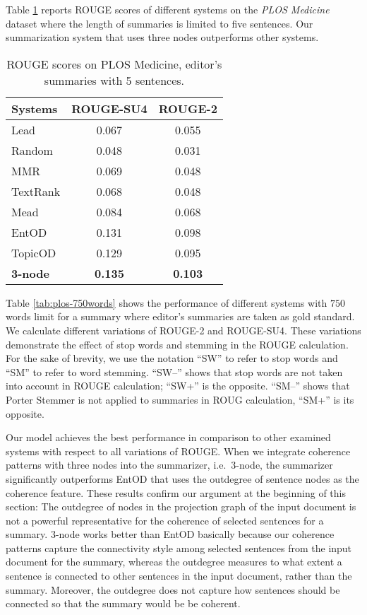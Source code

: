 Table \ref{table:plos_5len_editor} reports ROUGE scores of different systems on the \emph{PLOS Medicine} dataset where the length of summaries is limited to five sentences. 
Our summarization system that uses three nodes outperforms other systems.  


\begin{table}[!ht]
	\begin{center}
		\begin{tabular}{lcc}
		\toprule
		\textbf{Systems} 			& \textbf{ROUGE-SU4} &\textbf{ROUGE-2}\\
		\midrule
		Lead 				& 0.067 	& 0.055  \\
		Random 				& 0.048  	& 0.031  \\
		MMR 				& 0.069 	& 0.048  \\
		TextRank 			& 0.068  	& 0.048  \\
		Mead 				& 0.084 	& 0.068  \\
		EntOD 				& 0.131		& 0.098  \\
		TopicOD				& 0.129 	& 0.095  \\
		\textbf{3-node} 				& \textbf{0.135} & \textbf{0.103} \\
		\bottomrule
		\end{tabular}
	\end{center}
	\caption{
	ROUGE scores on PLOS Medicine, editor's summaries with 5 sentences.}
	\label{table:plos_5len_editor}
\end{table}

Table \ref{tab:plos-750words} shows the performance of different systems with $750$ words limit for a summary where editor's summaries are taken as gold standard. 
We calculate different variations of ROUGE-2 and ROUGE-SU4. 
These variations demonstrate the effect of stop words and stemming in the ROUGE calculation.
For the sake of brevity, we use the notation ``SW'' to refer to stop words and ``SM'' to refer to word stemming.  
``SW--'' shows that stop words are not taken into account in ROUGE calculation; ``SW+'' is the opposite. 
``SM--'' shows that Porter Stemmer is not applied to summaries in ROUG calculation, ``SM+'' is its opposite. 
 
Our model achieves the best performance in comparison to other examined systems with respect to all variations of ROUGE. 
When we integrate coherence patterns with three nodes into the summarizer, i.e.\ 3-node, the summarizer significantly outperforms EntOD that uses the outdegree of sentence nodes as the coherence feature. 
These results confirm our argument at the beginning of this section: The outdegree of nodes in the projection graph of the input document is not a powerful representative for the coherence of selected sentences for a summary. 
3-node works better than EntOD basically because our coherence patterns capture the connectivity style among selected sentences from the input document for the summary, whereas
the outdegree measures to what extent a sentence is connected to other sentences in the input document, rather than the summary. 
Moreover, the outdegree does not capture how sentences should be connected so that the summary would be be coherent. 

